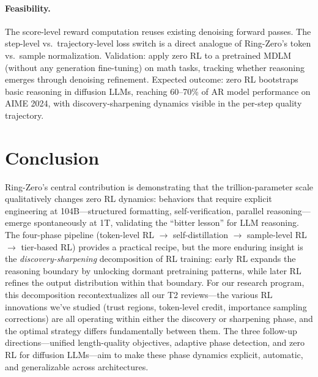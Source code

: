 \documentclass[11pt,a4paper]{article}
\begin{document}
\paragraph{Feasibility.} The score-level reward computation reuses existing denoising forward passes. The step-level vs.\ trajectory-level loss switch is a direct analogue of Ring-Zero's token vs.\ sample normalization. Validation: apply zero RL to a pretrained MDLM~\cite{sumi2026} (without any generation fine-tuning) on math tasks, tracking whether reasoning emerges through denoising refinement. Expected outcome: zero RL bootstraps basic reasoning in diffusion LLMs, reaching 60--70\% of AR model performance on AIME 2024, with discovery-sharpening dynamics visible in the per-step quality trajectory.

\section{Conclusion}

Ring-Zero's central contribution is demonstrating that the trillion-parameter scale qualitatively changes zero RL dynamics: behaviors that require explicit engineering at 104B---structured formatting, self-verification, parallel reasoning---emerge spontaneously at 1T, validating the ``bitter lesson'' for LLM reasoning. The four-phase pipeline (token-level RL $\to$ self-distillation $\to$ sample-level RL $\to$ tier-based RL) provides a practical recipe, but the more enduring insight is the \emph{discovery-sharpening} decomposition of RL training: early RL expands the reasoning boundary by unlocking dormant pretraining patterns, while later RL refines the output distribution within that boundary. For our research program, this decomposition recontextualizes all our T2 reviews---the various RL innovations we've studied (trust regions, token-level credit, importance sampling corrections) are all operating within either the discovery or sharpening phase, and the optimal strategy differs fundamentally between them. The three follow-up directions---unified length-quality objectives, adaptive phase detection, and zero RL for diffusion LLMs---aim to make these phase dynamics explicit, automatic, and generalizable across architectures.
\end{document}
